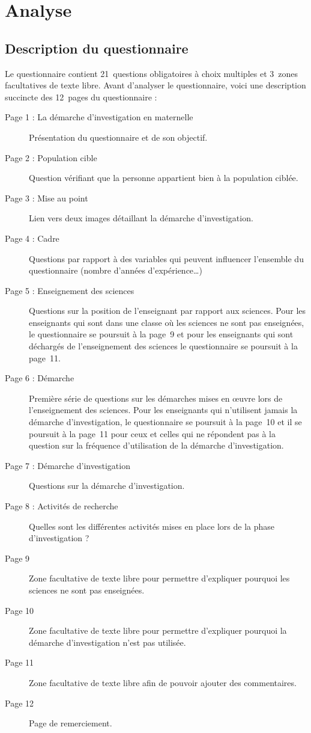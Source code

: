 \chapter{Analyse}
\section{Description du questionnaire}
Le questionnaire contient 21~questions obligatoires à choix multiples et 3~zones facultatives de texte libre. Avant d’analyser le questionnaire, voici une description succincte des 12~pages du questionnaire :
\begin{description}
\item[Page 1 : La démarche d’investigation en maternelle] Présentation du questionnaire et de son objectif.
\item[Page 2 : Population cible] Question vérifiant que la personne appartient bien à la population ciblée.
\item[Page 3 : Mise au point] Lien vers deux images détaillant la démarche d’investigation.
\item[Page 4 : Cadre] Questions par rapport à des variables qui peuvent influencer l’ensemble du questionnaire (nombre d’années d’expérience\dots)
\item[Page 5 : Enseignement des sciences] Questions sur la position de l’enseignant par rapport aux sciences. Pour les enseignants qui sont dans une classe où les sciences ne sont pas enseignées, le questionnaire se poursuit à la page~9  et pour les enseignants qui sont déchargés de l’enseignement des sciences le questionnaire se poursuit à la page~11.
\item[Page 6 : Démarche] Première série de questions sur les démarches mises en œuvre lors de l’enseignement des sciences. Pour les enseignants qui n’utilisent jamais la démarche d’investigation, le questionnaire se poursuit à la page~10 et il se poursuit à la page~11 pour ceux et celles qui ne répondent pas à la question sur la fréquence d’utilisation de la démarche d’investigation.
\item[Page 7 : Démarche d’investigation] Questions sur la démarche d’investigation.
\item[Page 8 : Activités de recherche] Quelles sont les différentes activités mises en place lors de la phase d’investigation ?
\item[Page 9] Zone facultative de texte libre pour permettre d’expliquer pourquoi les sciences ne sont pas enseignées.
\item[Page 10] Zone facultative de texte libre pour permettre d’expliquer pourquoi la démarche d’investigation n’est pas utilisée.
\item[Page 11] Zone facultative de texte libre afin de pouvoir ajouter des commentaires.
\item[Page 12] Page de remerciement.
\end{description}

